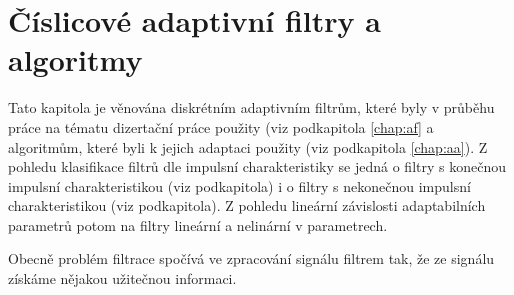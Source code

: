 \chapter{Číslicové adaptivní filtry a algoritmy}\label{chap:af_reserse}
Tato kapitola je věnována diskrétním adaptivním filtrům, které byly v průběhu práce na tématu dizertační práce použity (viz podkapitola \ref{chap:af} a algoritmům, které byli k jejich adaptaci použity (viz podkapitola \ref{chap:aa}). Z pohledu klasifikace filtrů dle impulsní charakteristiky se jedná o filtry s konečnou impulsní charakteristikou (viz podkapitola) i o filtry s nekonečnou impulsní charakteristikou (viz podkapitola). Z pohledu lineární závislosti adaptabilních parametrů potom na filtry lineární a nelinární v parametrech.
\par 
Obecně problém filtrace spočívá ve zpracování signálu filtrem tak, že ze signálu získáme nějakou užitečnou informaci\cite{haykin}.

